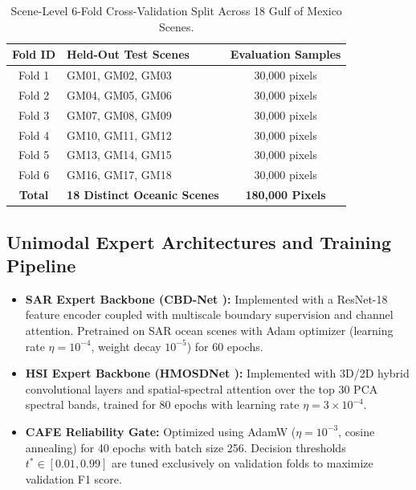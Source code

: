 \documentclass[conference]{IEEEtran}
\begin{document}
\begin{table}[!ht]
\centering
\caption{Scene-Level 6-Fold Cross-Validation Split Across 18 Gulf of Mexico Scenes.}
\label{tab:folds_split}
\renewcommand{\arraystretch}{1.05}
\setlength{\tabcolsep}{5pt}
\scriptsize
\begin{tabularx}{\columnwidth}{c|X|c}
\hline
\textbf{Fold ID} & \textbf{Held-Out Test Scenes} & \textbf{Evaluation Samples} \\
\hline
Fold 1 & GM01, GM02, GM03 & 30,000 pixels \\
Fold 2 & GM04, GM05, GM06 & 30,000 pixels \\
Fold 3 & GM07, GM08, GM09 & 30,000 pixels \\
Fold 4 & GM10, GM11, GM12 & 30,000 pixels \\
Fold 5 & GM13, GM14, GM15 & 30,000 pixels \\
Fold 6 & GM16, GM17, GM18 & 30,000 pixels \\
\hline
\textbf{Total} & \textbf{18 Distinct Oceanic Scenes} & \textbf{180,000 Pixels} \\
\hline
\end{tabularx}
\end{table}

\subsection{Unimodal Expert Architectures and Training Pipeline}
\begin{itemize}
    \item \textbf{SAR Expert Backbone (CBD-Net \cite{zhu2022oil}):} Implemented with a ResNet-18 feature encoder coupled with multiscale boundary supervision and channel attention. Pretrained on SAR ocean scenes with Adam optimizer (learning rate $\eta = 10^{-4}$, weight decay $10^{-5}$) for 60 epochs.
    \item \textbf{HSI Expert Backbone (HMOSDNet \cite{zhang2025hyperspectral}):} Implemented with 3D/2D hybrid convolutional layers and spatial-spectral attention over the top 30 PCA spectral bands, trained for 80 epochs with learning rate $\eta = 3 \times 10^{-4}$.
    \item \textbf{CAFE Reliability Gate:} Optimized using AdamW ($\eta = 10^{-3}$, cosine annealing) for 40 epochs with batch size 256. Decision thresholds $t^* \in [0.01, 0.99]$ are tuned exclusively on validation folds to maximize validation F1 score.
\end{itemize}
\end{document}
